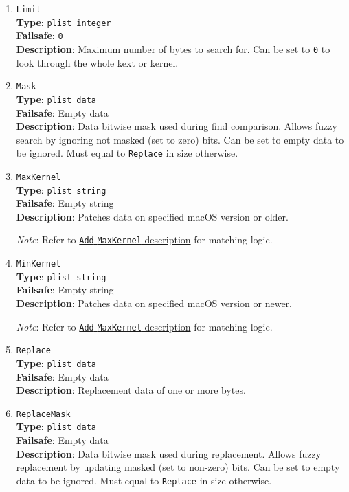 \documentclass[]{article}
\begin{document}
\begin{enumerate}
\item
  \texttt{Limit}\\
  \textbf{Type}: \texttt{plist\ integer}\\
  \textbf{Failsafe}: \texttt{0}\\
  \textbf{Description}: Maximum number of bytes to search for. Can be set to
  \texttt{0} to look through the whole kext or kernel.

\item
  \texttt{Mask}\\
  \textbf{Type}: \texttt{plist\ data}\\
  \textbf{Failsafe}: Empty data\\
  \textbf{Description}: Data bitwise mask used during find comparison.
  Allows fuzzy search by ignoring not masked (set to zero) bits. Can be
  set to empty data to be ignored. Must equal to \texttt{Replace} in size
  otherwise.

\item
  \texttt{MaxKernel}\\
  \textbf{Type}: \texttt{plist\ string}\\
  \textbf{Failsafe}: Empty string\\
  \textbf{Description}: Patches data on specified macOS version or older.

  \emph{Note}: Refer to \hyperlink{kernmatch}{\texttt{Add} \texttt{MaxKernel} description} for matching logic.

\item
  \texttt{MinKernel}\\
  \textbf{Type}: \texttt{plist\ string}\\
  \textbf{Failsafe}: Empty string\\
  \textbf{Description}: Patches data on specified macOS version or newer.

  \emph{Note}: Refer to \hyperlink{kernmatch}{\texttt{Add} \texttt{MaxKernel} description} for matching logic.

\item
  \texttt{Replace}\\
  \textbf{Type}: \texttt{plist\ data}\\
  \textbf{Failsafe}: Empty data\\
  \textbf{Description}: Replacement data of one or more bytes.

\item
  \texttt{ReplaceMask}\\
  \textbf{Type}: \texttt{plist\ data}\\
  \textbf{Failsafe}: Empty data\\
  \textbf{Description}: Data bitwise mask used during replacement.
  Allows fuzzy replacement by updating masked (set to non-zero) bits. Can be
  set to empty data to be ignored. Must equal to \texttt{Replace} in size
  otherwise.


\end{enumerate}
\end{document}

